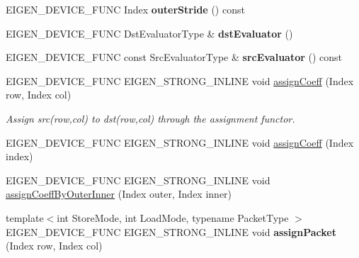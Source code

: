 \begin{DoxyCompactItemize}
E\+I\+G\+E\+N\+\_\+\+D\+E\+V\+I\+C\+E\+\_\+\+F\+U\+NC Index {\bfseries outer\+Stride} () const
\item 
\mbox{\label{class_eigen_1_1internal_1_1generic__dense__assignment__kernel_a2c7beed12a0efbd0483fd0a6b77be631}} 
E\+I\+G\+E\+N\+\_\+\+D\+E\+V\+I\+C\+E\+\_\+\+F\+U\+NC Dst\+Evaluator\+Type \& {\bfseries dst\+Evaluator} ()
\item 
\mbox{\label{class_eigen_1_1internal_1_1generic__dense__assignment__kernel_ae487f9d6cb537e16078bf2aceadfc1d7}} 
E\+I\+G\+E\+N\+\_\+\+D\+E\+V\+I\+C\+E\+\_\+\+F\+U\+NC const Src\+Evaluator\+Type \& {\bfseries src\+Evaluator} () const
\item 
\mbox{\label{class_eigen_1_1internal_1_1generic__dense__assignment__kernel_a7ca974cc4049f1ef3d6f2feac94ea35b}} 
E\+I\+G\+E\+N\+\_\+\+D\+E\+V\+I\+C\+E\+\_\+\+F\+U\+NC E\+I\+G\+E\+N\+\_\+\+S\+T\+R\+O\+N\+G\+\_\+\+I\+N\+L\+I\+NE void \mbox{\hyperlink{class_eigen_1_1internal_1_1generic__dense__assignment__kernel_a7ca974cc4049f1ef3d6f2feac94ea35b}{assign\+Coeff}} (Index row, Index col)
\begin{DoxyCompactList}\small\item\em Assign src(row,col) to dst(row,col) through the assignment functor. \end{DoxyCompactList}\item 
E\+I\+G\+E\+N\+\_\+\+D\+E\+V\+I\+C\+E\+\_\+\+F\+U\+NC E\+I\+G\+E\+N\+\_\+\+S\+T\+R\+O\+N\+G\+\_\+\+I\+N\+L\+I\+NE void \mbox{\hyperlink{class_eigen_1_1internal_1_1generic__dense__assignment__kernel_a9f36120222600d1d843b4253b08a383b}{assign\+Coeff}} (Index index)
\item 
E\+I\+G\+E\+N\+\_\+\+D\+E\+V\+I\+C\+E\+\_\+\+F\+U\+NC E\+I\+G\+E\+N\+\_\+\+S\+T\+R\+O\+N\+G\+\_\+\+I\+N\+L\+I\+NE void \mbox{\hyperlink{class_eigen_1_1internal_1_1generic__dense__assignment__kernel_aff1bc113e270d4f895ca90570536303b}{assign\+Coeff\+By\+Outer\+Inner}} (Index outer, Index inner)
\item 
\mbox{\label{class_eigen_1_1internal_1_1generic__dense__assignment__kernel_aaed04d17fc441168ff9d7dfbda9f7c6e}} 
{\footnotesize template$<$int Store\+Mode, int Load\+Mode, typename Packet\+Type $>$ }\\E\+I\+G\+E\+N\+\_\+\+D\+E\+V\+I\+C\+E\+\_\+\+F\+U\+NC E\+I\+G\+E\+N\+\_\+\+S\+T\+R\+O\+N\+G\+\_\+\+I\+N\+L\+I\+NE void {\bfseries assign\+Packet} (Index row, Index col)

\end{DoxyCompactItemize}

